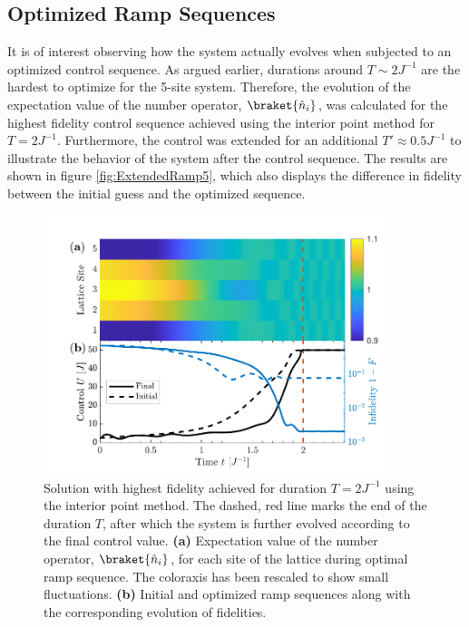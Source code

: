 \subsection{Optimized Ramp Sequences}
It is of interest observing how the system actually evolves when subjected to an optimized control sequence. As argued earlier, durations around $T \sim 2 J^{-1}$ are the hardest to optimize for the 5-site system. Therefore, the evolution of the expectation value of the number operator, $\braket{\hat{n}_i}$, was calculated for the highest fidelity control sequence achieved using the interior point method for $T = 2 J^{-1}$. Furthermore, the control was extended for an additional $T ' \approx 0.5 J^{-1}$ to illustrate the behavior of the system after the control sequence. The results are shown in figure \ref{fig:ExtendedRamp5}, which also displays the difference in fidelity between the initial guess and the optimized sequence.
\begin{figure}[h!]
    \centering
    \includegraphics[width=0.9\textwidth]{Figures/L5/RampPlot.pdf}
    \caption{Solution with highest fidelity achieved for duration $T = 2 J^{-1}$ using the interior point method. The dashed, red line marks the end of the duration $T$, after which the system is further evolved according to the final control value. \textbf{(a)} Expectation value of the number operator, $\braket{\hat{n}_i}$, for each site of the lattice during optimal ramp sequence. The coloraxis has been rescaled to show small fluctuations. \textbf{(b)} Initial and optimized ramp sequences along with the corresponding evolution of fidelities.}
    \label{fig:ExtendedRamp}
\end{figure} 

